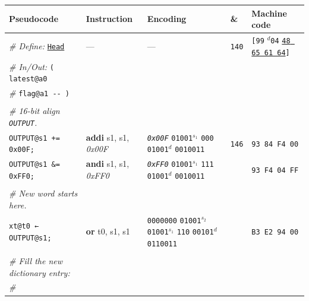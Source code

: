 \documentclass[a4paper,12pt,final]{article}
\begin{document}
\begin{table}[!htbp] \begin{adjustwidth}{-1cm}{-1cm} \fontsize{7}{8.400000}\selectfont
\begin{center}
\begin{tabular}{l|ll|l|l}
\textbf{Pseudocode} & \textbf{Instruction} & \textbf{Encoding} & \textbf{\&} & \textbf{Machine code}\\[0pt]
\hline
\emph{\# Define:} \uline{\texttt{Head}} & --- & --- & \texttt{140} & \texttt{[99} \(^{d}\)​\texttt{04} \uline{\texttt{48 65 61 64}}​\texttt{]}\\[0pt]
\emph{\# In/Out:} \texttt{( latest@a0} &  &  &  & \\[0pt]
\emph{\#}\hspace{4.9em}   \texttt{flag@a1 -​- )} &  &  &  & \\[0pt]
 &  &  &  & \\[0pt]
\hspace{1.053000em}​\emph{\# 16-bit align \texttt{OUTPUT}.} &  &  &  & \\[0pt]
\hspace{1.053000em}​\texttt{OUTPUT@s1 += 0x00F;} & \textbf{addi} s1, s1, \emph{0x00F} & \emph{\texttt{0x00F}}                    \texttt{01001}​\(^{s_{1}}\) \texttt{000} \texttt{01001}​\(^{d}\)  \texttt{0010011} & \texttt{146} & \texttt{93 84 F4 00}\\[0pt]
\hspace{1.053000em}​\texttt{OUTPUT@s1 \&= 0xFF0;} & \textbf{andi} s1, s1, \emph{0xFF0} & \emph{\texttt{0xFF0}}                    \texttt{01001}​\(^{s_{1}}\) \texttt{111} \texttt{01001}​\(^{d}\)  \texttt{0010011} &  & \texttt{93 F4 04 FF}\\[0pt]
 &  &  &  & \\[0pt]
\hspace{1.053000em}​\emph{\# New word starts here.} &  &  &  & \\[0pt]
\hspace{1.053000em}​\texttt{xt@t0 ← OUTPUT@s1;} & \textbf{or} t0, s1, s1 & \texttt{0000000} \texttt{01001}​\(^{s_{2}}\) \texttt{01001}​\(^{s_{1}}\) \texttt{110} \texttt{00101}​\(^{d}\)  \texttt{0110011} &  & \texttt{B3 E2 94 00}\\[0pt]
 &  &  &  & \\[0pt]
\hspace{1.053000em}​\emph{\# Fill the new dictionary entry:} &  &  &  & \\[0pt]
\hspace{1.053000em}​\emph{\#} &  &  &  & \\[0pt]

\end{tabular}
\end{center}
\end{adjustwidth}
\end{table}
\end{document}
